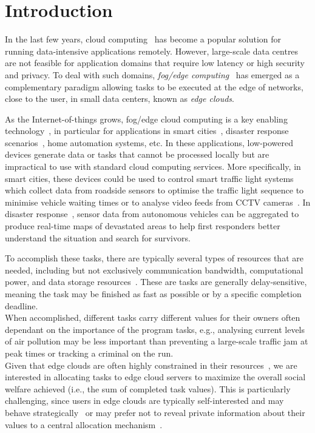 \section{Introduction}
\label{sec:introduction}
In the last few years, cloud computing~\cite{cloud_cite} has become a popular solution for running data-intensive
applications remotely. However, large-scale data centres are not feasible for application domains that require low
latency or high security and privacy. To deal with such domains, \emph{fog/edge computing}~\cite{mobile_edge_IoT} has
emerged as a complementary paradigm allowing tasks to be executed at the edge of networks, close to the user, in small
data centers, known as \emph{edge clouds}.

As the Internet-of-things grows, fog/edge cloud computing is a key enabling
technology~\cite{mobile_edge_IoT, edge_computing_iot}, in particular for applications
in smart cities~\cite{mobile_edge_smart}, disaster response scenarios~\cite{mobile_edge_disaster, smart_disaster_management},
home automation systems, etc. In these applications, low-powered devices
generate data or tasks that cannot be processed locally but are impractical to use with standard cloud computing
services. More specifically, in smart cities, these devices could be used to control smart traffic light
systems~\cite{smart_cities_traffic_lights} which collect data from roadside sensors to optimise the traffic light
sequence to minimise vehicle waiting times or to analyse video feeds from CCTV cameras~\cite{Sreenu2019}. In disaster
response~\cite{smart_disaster_management}, sensor data from autonomous vehicles can be aggregated to produce real-time
maps of devastated areas to help first responders better understand the situation and search for survivors.

To accomplish these tasks, there are typically several types of resources that are needed, including but not exclusively
communication bandwidth, computational power, and data storage resources~\cite{vaji_infocom}. These are tasks are
generally delay-sensitive, meaning the task may be finished as fast as possible or by a specific completion deadline. \\
When accomplished, different tasks carry different values for their owners often dependant on the importance of the
program tasks, e.g., analysing current levels of air pollution may be less important than preventing a large-scale
traffic jam at peak times or tracking a criminal on the run. \\
Given that edge clouds are often highly constrained in their resources~\cite{edge_limitations}, we are interested in
allocating tasks to edge cloud servers to maximize the overall social welfare achieved (i.e., the sum of completed task
values). This is particularly challenging, since users in edge clouds are typically self-interested and may behave
strategically~\cite{Bi2019} or may prefer not to reveal private information about their values to a central allocation
mechanism~\cite{Pai2013}.

